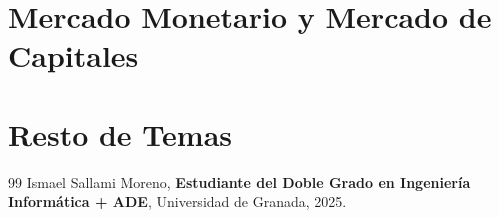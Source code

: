 \documentclass[a4paper,12pt]{book}
\begin{document}
\chapter{Mercado Monetario y Mercado de Capitales}



\chapter{Resto de Temas}








\newpage
\begin{thebibliography}{99}
Ismael Sallami Moreno, \textbf{Estudiante del Doble Grado en Ingeniería Informática + ADE}, Universidad de Granada, 2025.

\end{thebibliography}
\end{document}
